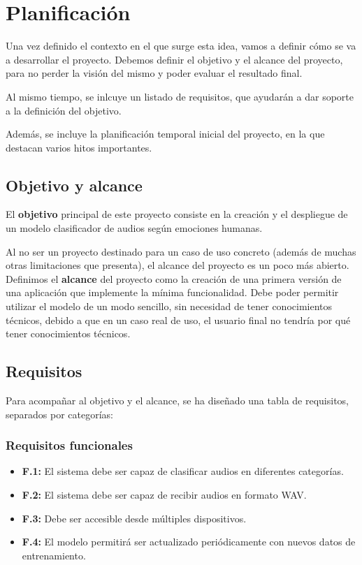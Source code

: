 \section{Planificación}\label{sec:planificacion}

Una vez definido el contexto en el que surge esta idea, vamos a definir cómo se va a desarrollar el proyecto.
Debemos definir el objetivo y el alcance del proyecto, para no perder la visión del mismo y poder evaluar el resultado final.

Al mismo tiempo, se inlcuye un listado de requisitos, que ayudarán a dar soporte a la definición del objetivo.

Además, se incluye la planificación temporal inicial del proyecto, en la que destacan varios hitos importantes.


\subsection{Objetivo y alcance}\label{sec:objetivo}
El \textbf{objetivo} principal de este proyecto consiste en la creación y el despliegue de un modelo clasificador de audios según emociones humanas.

Al no ser un proyecto destinado para un caso de uso concreto (además de muchas otras limitaciones que presenta), el alcance del proyecto es un poco más abierto.
Definimos el \textbf{alcance} del proyecto como la creación de una primera versión de una aplicación que implemente la mínima funcionalidad.
Debe poder permitir utilizar el modelo de un modo sencillo, sin necesidad de tener conocimientos técnicos, debido a que en un caso real de uso, el usuario final no tendría por qué tener conocimientos técnicos.


\subsection{Requisitos}\label{sec:requisitos}

Para acompañar al objetivo y el alcance, se ha diseñado una tabla de requisitos, separados por categorías:

\subsubsection{Requisitos funcionales}\label{sec:requisitos-funcionales}
\begin{itemize}\itemsep1pt \parskip0pt 
    \item \textbf{F.1:} El sistema debe ser capaz de clasificar audios en diferentes categorías.
    \item \textbf{F.2:} El sistema debe ser capaz de recibir audios en formato WAV.
    \item \textbf{F.3:} Debe ser accesible desde múltiples dispositivos.
    \item \textbf{F.4:} El modelo permitirá ser actualizado periódicamente con nuevos datos de entrenamiento.
\end{itemize}

